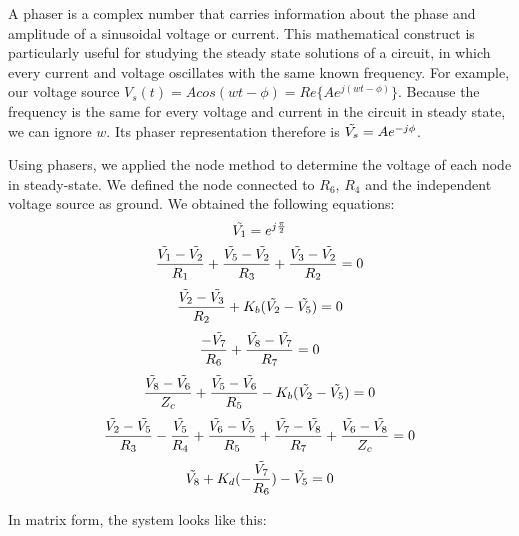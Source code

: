 A phaser is a complex number that carries information about the phase and amplitude of a sinusoidal voltage or current. This mathematical construct is particularly useful for studying the steady state solutions of a circuit, in which every current and voltage oscillates with the same known frequency. For example, our voltage source $V_s(t) = Acos(wt - \phi) = Re\{Ae^{j(wt-\phi)}\}$. Because the frequency is the same for every voltage and current in the circuit in steady state, we can ignore $w$. Its phaser representation therefore is  $\Tilde{V_s} = Ae^{-j\phi}$. 
\par
Using phasers, we applied the node method to determine the voltage of each node in steady-state. We defined the node connected to $R_6$, $R_4$ and the independent voltage source as ground.
We obtained the following equations:
\begin{equation*}
    \Tilde{V_1} = e^{j\frac{\pi}{2}}
\end{equation*}
\begin{equation*}
    \frac{\Tilde{V_1} - \Tilde{V_2} }{R_1} + \frac{\Tilde{V_5} - \Tilde{V_2}}{R_3} + \frac{\Tilde{V_3}-\Tilde{V_2}}{R_2} = 0
\end{equation*}
\begin{equation*}
    \frac{\Tilde{V_2}-\Tilde{V_3}}{R_2} + K_b(\Tilde{V_2}-\Tilde{V_5}) = 0
\end{equation*}
\begin{equation*}
    \frac{-\Tilde{V_7}}{R_6} + \frac{\Tilde{V_8}-\Tilde{V_7}}{R_7} = 0
\end{equation*}
\begin{equation*}
    \frac{\Tilde{V_8} - \Tilde{V_6}}{Z_c} + \frac{\Tilde{V_5} - \Tilde{V_6}}{R_5} - K_b(\Tilde{V_2} - \Tilde{V_5}) = 0
\end{equation*}
\begin{equation*}
    \frac{\Tilde{V_2} - \Tilde{V_5}}{R_3} - \frac{\Tilde{V_5}}{R_4} + \frac{\Tilde{V_6}-\Tilde{V_5}}{R_5} + \frac{\Tilde{V_7}-\Tilde{V_8}}{R_7} + \frac{\Tilde{V_6}-\Tilde{V_8}}{Z_c} = 0
\end{equation*}
\begin{equation*}
    \Tilde{V_8} + K_d(-\frac{\Tilde{V_7}}{R_6}) - \Tilde{V_5} = 0
\end{equation*}


In matrix form, the system looks like this:



